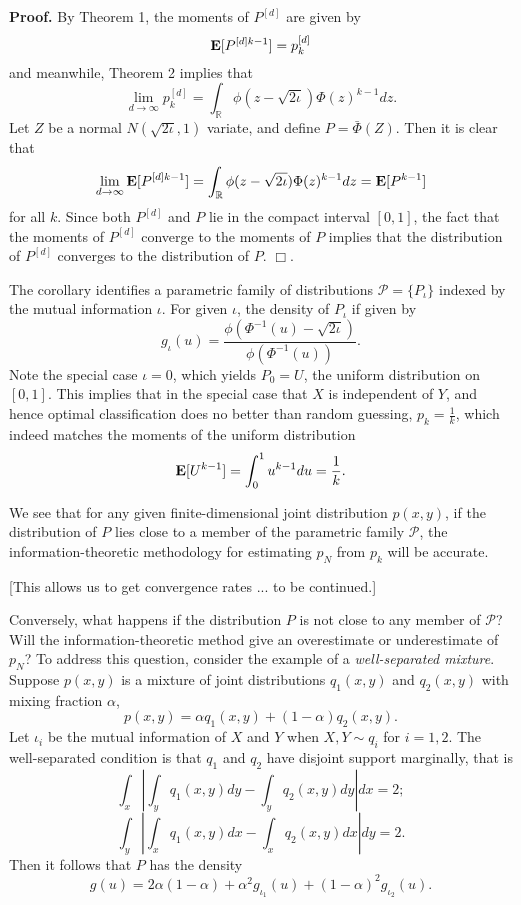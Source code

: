 \documentclass[12pt]{article}
\begin{document}
\noindent\textbf{Proof.} By Theorem 1, the moments of $P^{[d]}$ are given by
\[
\textbf{E}[P^{[d]k-1}] = p_k^{[d]}
\]
and meanwhile, Theorem 2 implies that
\[
\lim_{d \to \infty} p_k^{[d]} = \int_{\mathbb{R}} \phi(z - \sqrt{2\iota}) \Phi(z)^{k-1} dz.
\]
Let $Z$ be a normal $N(\sqrt{2\iota}, 1)$ variate,
and define $P = \bar{\Phi}(Z)$.
Then it is clear that
\[
\lim_{d \to \infty} \textbf{E}[P^{[d]k-1}] = \int_{\mathbb{R}} \phi(z - \sqrt{2\iota}) \Phi(z)^{k-1} dz = \textbf{E}[P^{k-1}]
\]
for all $k$.
Since both $P^{[d]}$ and $P$ lie in the compact interval $[0, 1]$,
the fact that the moments of $P^{[d]}$ converge to the moments of $P$ implies that the distribution of $P^[d]$
converges to the distribution of $P$. $\Box$.

The corollary identifies a parametric family of distributions $\mathcal{P} = \{P_\iota\}$ indexed by
the mutual information $\iota$.
For given $\iota$, the density of $P_\iota$ if given by
\[
g_\iota(u) = \frac{\phi(\Phi^{-1}(u) - \sqrt{2\iota})}{\phi(\Phi^{-1}(u))}.
\]
Note the special case $\iota = 0$, which yields $P_0 = U$, the uniform distribution on $[0,1]$.
This implies that in the special case that $X$ is independent of $Y$,
and hence optimal classification does no better than random guessing, $p_k = \frac{1}{k}$,
which indeed matches the moments of the uniform distribution
\[
\textbf{E}[U^{k-1}] = \int_0^1 u^{k-1} du = \frac{1}{k}.
\]

We see that for any given finite-dimensional joint distribution $p(x, y)$, if the distribution of $P$ lies close
to a member of the parametric family $\mathcal{P}$, the information-theoretic methodology for estimating
$p_N$ from $p_k$ will be accurate.

[This allows us to get convergence rates ... to be continued.]

Conversely, what happens if the distribution $P$ is not close to any member of $\mathcal{P}$?
Will the information-theoretic method give an overestimate or underestimate of $p_N$?
To address this question, consider the example of a \emph{well-separated mixture}.
Suppose $p(x,y)$ is a mixture of joint distributions $q_1(x,y)$ and $q_2(x,y)$ with mixing fraction $\alpha$,
\[
p(x, y) = \alpha q_1(x, y) + (1-\alpha) q_2(x, y).
\]
Let $\iota_i$ be the mutual information of $X$ and $Y$ when $X, Y \sim q_i$
for $i = 1,2$.
The well-separated condition is that $q_1$ and $q_2$ have disjoint support marginally, that is
\[
\int_x \left| \int_y q_1(x, y) dy - \int_y q_2(x, y) dy\right| dx = 2;
\]
\[
\int_y \left| \int_x q_1(x, y) dx - \int_x q_2(x, y) dx\right| dy = 2.
\]
Then it follows that $P$ has the density
\[
g(u) = 2\alpha(1-\alpha) + \alpha^2 g_{\iota_1}(u) + (1-\alpha)^2 g_{\iota_2}(u).
\]
\end{document}
